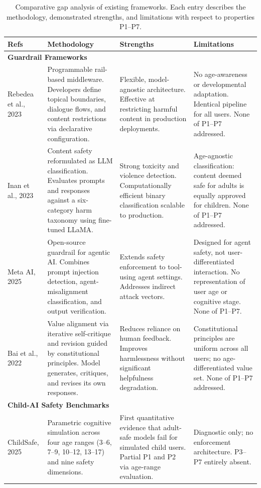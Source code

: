 \documentclass[fleqn,10pt]{wlscirep}
\begin{document}
\begin{table}[htbp]
\centering
\caption{Comparative gap analysis of existing frameworks. Each entry describes the methodology, demonstrated strengths, and limitations with respect to properties P1--P7.}
\label{tab:gap}
\small
\begin{tabular}{p{2cm}p{4cm}p{3.5cm}p{4.5cm}}
\hline
\textbf{Refs} & \textbf{Methodology} & \textbf{Strengths} & \textbf{Limitations} \\
\hline
\multicolumn{4}{l}{\textbf{Guardrail Frameworks}} \\
\hline
Rebedea et al., 2023 & Programmable rail-based middleware. Developers define topical boundaries, dialogue flows, and content restrictions via declarative configuration. & Flexible, model-agnostic architecture. Effective at restricting harmful content in production deployments. & No age-awareness or developmental adaptation. Identical pipeline for all users. None of P1--P7 addressed. \\
\hline
Inan et al., 2023 & Content safety reformulated as LLM classification. Evaluates prompts and responses against a six-category harm taxonomy using fine-tuned LLaMA. & Strong toxicity and violence detection. Computationally efficient binary classification scalable to production. & Age-agnostic classification: content deemed safe for adults is equally approved for children. None of P1--P7 addressed. \\
\hline
Meta AI, 2025 & Open-source guardrail for agentic AI. Combines prompt injection detection, agent-misalignment classification, and output verification. & Extends safety enforcement to tool-using agent settings. Addresses indirect attack vectors. & Designed for agent safety, not user-differentiated interaction. No representation of user age or cognitive stage. None of P1--P7. \\
\hline
Bai et al., 2022 & Value alignment via iterative self-critique and revision guided by constitutional principles. Model generates, critiques, and revises its own responses. & Reduces reliance on human feedback. Improves harmlessness without significant helpfulness degradation. & Constitutional principles are uniform across all users; no age-differentiated value set. None of P1--P7 addressed. \\
\hline
\multicolumn{4}{l}{\textbf{Child-AI Safety Benchmarks}} \\
\hline
ChildSafe, 2025 & Parametric cognitive simulation across four age ranges (3--6, 7--9, 10--12, 13--17) and nine safety dimensions. & First quantitative evidence that adult-safe models fail for simulated child users. Partial P1 and P2 via age-range evaluation. & Diagnostic only; no enforcement architecture. P3--P7 entirely absent. \\

\end{tabular}
\end{table}
\end{document}
